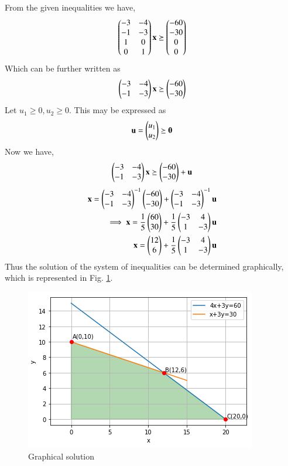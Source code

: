 
From the given inequalities we have,
\begin{align}
    \begin{pmatrix}-3&-4 \\ -1&-3 \\ 1&0 \\ 0&1\end{pmatrix}\mathbf{x} \succeq \begin{pmatrix}-60 \\ -30 \\ 0 \\ 0\end{pmatrix}
\end{align}
Which can be further written as
\begin{align}
   \begin{pmatrix}-3&-4 \\ -1&-3 \end{pmatrix}\mathbf{x} \succeq \begin{pmatrix}-60 \\ -30\end{pmatrix} 
\end{align}
Let $u_1 \ge 0, u_2 \ge 0$.  This may be expressed as
\begin{align}
\mathbf{u} = \begin{pmatrix}u_1\\u_2\end{pmatrix}\succeq \mathbf{0}
\end{align}
Now we have,
\begin{align}
  \begin{pmatrix}-3&-4 \\ -1&-3 \end{pmatrix}\mathbf{x} \succeq \begin{pmatrix}-60 \\ -30\end{pmatrix}  + \mathbf{u} 
\end{align}
\begin{align}
        \mathbf{x} = \begin{pmatrix}-3 & -4 \\ -1 & -3\end{pmatrix}^{-1}\begin{pmatrix}-60 \\ -30\end{pmatrix} + \begin{pmatrix}-3 & -4 \\ -1 & -3\end{pmatrix}^{-1}\mathbf{u}
        \\
        \implies \mathbf{x} = \frac{1}{5}\begin{pmatrix}60 \\ 30\end{pmatrix}+\frac{1}{5}\begin{pmatrix}-3&4 \\ 1&-3\end{pmatrix}\mathbf{u}
        \\
        \mathbf{x}=\begin{pmatrix}12 \\ 6\end{pmatrix}+\frac{1}{5}\begin{pmatrix}-3&4 \\ 1&-3\end{pmatrix}\mathbf{u}
    \end{align}
Thus the solution of the system of inequalities can be determined graphically, which is represented in Fig.     \ref{ineq/2/55/Graphical solution}.
%
\begin{figure}[ht]
    \centering
    \includegraphics[width=\columnwidth]{solutions/su2021/2/55/Graphical solution region.PNG}
    \caption{Graphical solution}
    \label{ineq/2/55/Graphical solution}
\end{figure}





